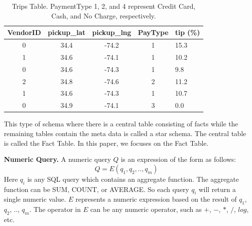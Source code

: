 \begin{table}
\small
\centering
\caption{\small Trips Table. PaymentType 1, 2, and 4 represent Credit Card, Cash, and No Charge, respectively.}
  \begin{tabular}{| c | c | c | c | l |}
    \hline
    {\bf VendorID} & \textbf{pickup\_lat} & \textbf{pickup\_lng} & \textbf{PayType} & \textbf{tip (\%)} \\ \hline
    0 & 34.4 & -74.2 & 1 & 15.3 \\ \hline
    1 & 34.6 & -74.1 & 1 & 10.2 \\ \hline
    0 & 34.6 & -74.3 & 1 & 9.8 \\ \hline
    2 & 34.8 & -74.6 & 2 & 11.2 \\ \hline
    1 & 34.6 & -74.3 & 1 & 10.7 \\ \hline
    0 & 34.9 & -74.1 & 3 & 0.0 \\
    \hline
  \end{tabular}
  \label{tbl:fact}
\end{table}

This type of schema where there is a central table consisting of facts while the remaining tables contain the meta data is called a star schema. The central table is called the Fact Table. In this paper, we focuses on the Fact Table. %



{\bf Numeric Query.} A numeric query $Q$ is an expression of the form as follows:
$$Q = E(q_1, q_2, .., q_m)$$
Here $q_i$ is any SQL query which contains an aggregate function. The aggregate function can be SUM, COUNT, or AVERAGE. So each query $q_i$ will return a single numeric value. $E$ represents a numeric expression based on the result of $q_1$, $q_2$, .., $q_m$. The operator in $E$ can be any numeric operator, such as $+$, $-$, $*$, $/$, $log$, etc.

